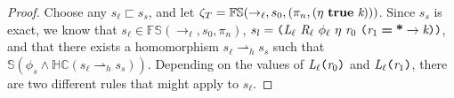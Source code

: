 \begin{proof}
Choose any $s_\ell \sqsubset s_s$, and let $\zeta_T = \mathbb{FS}(\rightarrow_{\ell},s_0,(\pi_n,(\eta\ \cfgt{true}\ \cfgnt{k})))$. Since $s_s$ is exact, we know that $s_\ell \in \mathbb{FS}(\rightarrow_{\ell},s_0,\pi_n)$, $s_l = \lp \cfgnt{L}_\ell\ \cfgnt{R}_\ell\ \phi_\ell\ \eta\ \cfgnt{r}_0\ \lp \cfgnt{r}_1\; \cfgt{=}\; \cfgt{*} \rightarrow \cfgnt{k}\rp \rp$, and that there exists a homomorphism $s_\ell \rightharpoonup_{h} s_s$ such that $\mathbb{S}( \phi_s \wedge \mathbb{HC}(s_\ell \rightharpoonup_{h} s_s) ) $. 
Depending on the values of $\emph{L}_\ell \texttt{(} \emph{r}_0\texttt{)}$ and $\emph{L}_\ell \texttt{(} \emph{r}_1 \texttt{)}$, there are two different rules that might apply to $s_\ell$.


\end{proof}
